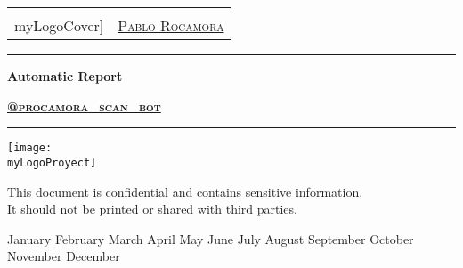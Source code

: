 \documentclass[a4paper]{article}
\makeatletter
\newcommand{\myLogoCover}{\VAR{icon1}}
\newcommand{\myLogoProyect}{\VAR{icon2}}
\newcommand{\myTitle}{Automatic Report}
\newcommand{\mySubtitle}{\href{https://telegram.me/procamora_scan_bot}{@procamora\_scan\_bot}}
\newcommand{\myName}{\href{https://github.com/procamora/bot_scan_networks}{Pablo Rocamora}}
\newcommand{\myMonth}{%
  \ifcase\month   %
    \or January   %
    \or February  %
    \or March     %
    \or April     %
    \or May       %
    \or June      %
    \or July      %
    \or August    %
    \or September %
    \or October   %
    \or November  %
    \or December  %
  \fi}
\newcommand{\myDate}{\currenttime\space \number\day\space \myMonth \number\year}
\makeatother
\begin{document}
\cfoot{\thepage}
\begin{titlepage}
	\centering
    
    \begin{tabular}{ll}
    \raisebox{-.4\height}{\texttt{[image: \\myLogoCover]}} & { \hspace{8cm} \scshape\LARGE {\myName}} \\
	\end{tabular}
    
    \par\vspace{1cm}
	\vfill
    
    {\rule{\linewidth}{0.5mm}\vspace{0.5cm}} %
    
    {\Huge\bfseries\textcolor{greenPortada}{\myTitle}}
	\par\vspace{0.5cm}
	{\scshape\LARGE \textbf{\mySubtitle}}

    {\vspace{0.5cm}\rule{\linewidth}{0.5mm}} %
    
	\vfill\vfill
	\texttt{[image: \\myLogoProyect]}\par\vspace{1cm}
	\vfill\vfill
    
	\begin{tcolorbox}[colback=red!5!white,colframe=red!75!black]
		\centering
		This document is confidential and contains sensitive information.
		\\
		It should not be printed or shared with third parties.
	\end{tcolorbox}
    
	\vfill\vfill
	{\large \myDate \par}
	\vfill
\end{titlepage}

	



\clearpage
\clearpage
\end{document}

